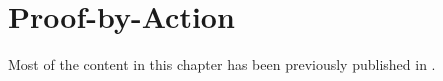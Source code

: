 \setchapterpreamble[u]{\margintoc}
\chapter{Proof-by-Action}

\begin{kaobox}[frametitle=Note]
  Most of the content in this chapter has been previously published in
  \cite{10.1145/3497775.3503692}.
\end{kaobox}





